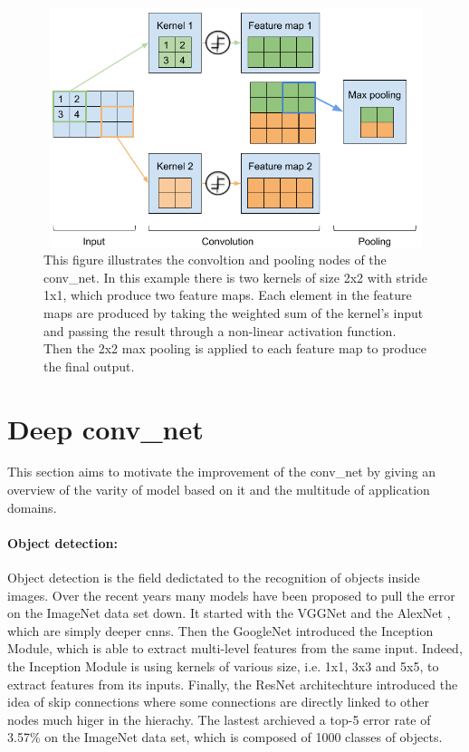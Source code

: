 \documentclass[11pt]{report}
\begin{document}
\begin{figure}[h]
\centering
\includegraphics[width=12cm, height=7cm]{conv_net}
\caption{This figure illustrates the convoltion and pooling nodes of the \acrshort{conv_net}. In this example there is two kernels of size 2x2 with stride 1x1, which produce two feature maps. Each element in the feature maps are produced by taking the weighted sum of the kernel's input and passing the result through a non-linear activation function. Then the 2x2 max pooling is applied to each feature map to produce the final output.}
\label{fig:conv_net}
\end{figure}
\section{Deep \acrshort{conv_net}}

This section aims to motivate the improvement of the \acrshort{conv_net} by giving an overview of the varity of model based on it and the multitude of application domains.

\paragraph{Object detection:} Object detection is the field dedictated to the recognition of objects inside images. Over the recent years many models have been proposed to pull the error on the ImageNet data set \cite{imagenet_cvpr09} down. It started with the VGGNet \cite{DBLP:journals/corr/RussakovskyDSKSMHKKBBF14} and the AlexNet \cite{DBLP:journals/cacm/KrizhevskySH17}, which are simply deeper \acrshort{cnn}s. Then the GoogleNet \cite{DBLP:conf/cvpr/SzegedyLJSRAEVR15} introduced the Inception Module, which is able to extract multi-level features from the same input. Indeed, the Inception Module is using kernels of various size, i.e. 1x1, 3x3 and 5x5, to extract features from its inputs. Finally, the ResNet architechture \cite{DBLP:conf/cvpr/HeZRS16} introduced the idea of skip connections where some connections are directly linked to other nodes much higer in the hierachy. The lastest archieved a top-5 error rate of 3.57\% on the ImageNet data set, which is composed of 1000 classes of objects.\newline
\end{document}

